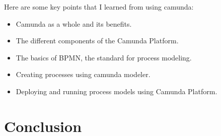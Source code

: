 \documentclass[12pt]{article}
\begin{document}
{Here are some key points that I learned from using camunda:

\begin{itemize}
  \item Camunda as a whole and its benefits.
  \item The different components of the Camunda Platform.
  \item The basics of BPMN, the standard for process modeling.
  \item Creating processes using camunda modeler.
  \item Deploying and running process models using Camunda Platform.
\end{itemize}

\pagebreak

\section{Conclusion}

}

\printbibliography
\end{document}
